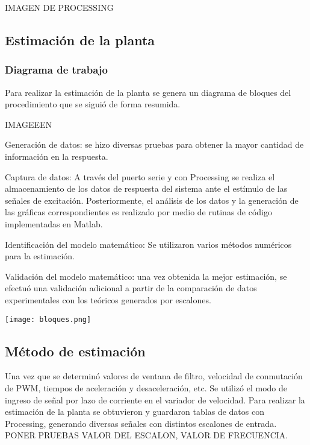 IMAGEN DE PROCESSING

\subsection{Estimación de la planta}
    \subsubsection{Diagrama de trabajo}

Para realizar la estimación de la planta se genera un diagrama de bloques del procedimiento que se siguió de forma resumida.

IMAGEEEN

Generación de datos:  se hizo diversas pruebas para obtener la mayor cantidad de información en la respuesta.

Captura de datos: A través del puerto serie y con Processing se realiza el almacenamiento de los datos de respuesta del sistema ante el estímulo de las señales de excitación. Posteriormente, el análisis de los datos y la generación de las gráficas correspondientes es realizado por medio de rutinas de código implementadas en Matlab.

Identificación del modelo matemático: Se utilizaron varios métodos numéricos para la estimación.

Validación del modelo matemático: una vez obtenida la mejor estimación, se efectuó una validación adicional a partir de la comparación de datos experimentales con los teóricos generados por escalones.




\begin{center}
\texttt{[image: bloques.png]}
\end{center}
\label{fig:bloques}

    \subsection{Método de estimación}
    Una vez que se determinó valores de ventana de filtro, velocidad de conmutación de PWM, tiempos de aceleración y desaceleración, etc. Se utilizó el modo de ingreso de señal por lazo de corriente en el variador de velocidad. Para realizar la estimación de la planta se obtuvieron y guardaron tablas de datos con Processing, generando diversas señales con distintos escalones de entrada. 
    PONER PRUEBAS VALOR DEL ESCALON, VALOR DE FRECUENCIA.
    
